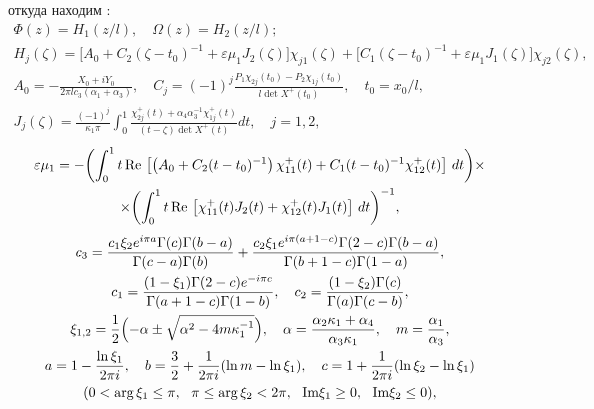 откуда находим \cite{vas-sil:bib:Hvochinskaya}:
\begin{gather*}
\Phi(z)=H_1(z/l), \quad   \Omega(z)=H_2(z/l);
\\
H_j(\zeta)=\bigl[A_0{+}C_2(\zeta{-}t_0)^{-1}{+}\varepsilon \mu_1 J_2(\zeta)\bigr]\chi_{j1}(\zeta)+  
\bigl[C_1(\zeta{-}t_0)^{-1}{+}\varepsilon\mu_1 J_1(\zeta)\bigr]\chi_{j2}(\zeta),\\
A_0=-\frac{X_0+iY_0}{2\pi lc_3(\alpha_1+\alpha_3)},\quad  C_j=(-1)^j\frac{P_1\chi_{2j}(t_0)-P_2\chi_{1j}(t_0)}{l\det X^{+}(t_0)},\quad  t_0=x_0/l,
\\
J_j(\zeta)=\frac{(-1)^j}{\kappa_1\pi}\int_0^1 \frac{\chi_{2j}^{+}(t)+\alpha_4\alpha_3^{-1}\chi_{1j}^{+}(t)}{(t-\zeta)\det X^{+}(t)} dt,\quad  j=1, 2,
\end{gather*}
\begin{multline*}
\varepsilon\mu_1=-\biggl(
\int _0^1 t\,\mbox{Re\,}\left[\left(A_0+C_2(t-t_0)^{-1}\right)\chi_{11}^{+}(t)+C_1(t-t_0)^{-1}\chi_{12}^{+}(t)\right]\,dt\biggr)\times \\
\times\biggl(\int _0^1 t\,\mbox{Re\,}\left[\chi_{11}^{+}(t)J_2(t)+\chi_{12}^{+}(t)J_1(t)\right]\,dt\biggr)^{-1},
\end{multline*}
\begin{gather*}
c_3=\frac{c_1\xi_2e^{i\pi a}\Gamma(c)\Gamma(b-a)}{\Gamma(c-a)\Gamma(b)}+\frac{c_2\xi_1e^{i\pi (a+1-c)}\Gamma(2-c)\Gamma(b-a)}{\Gamma(b+1-c)\Gamma(1-a)},\\
c_1=\frac{(1-\xi_1)\Gamma(2-c)e^{-i\pi c}}{\Gamma(a+1-c)\Gamma(1-b)},\quad  c_2=\frac{(1-\xi_2)\Gamma(c)}{\Gamma(a)\Gamma(c-b)}, \\
\xi_{1, 2}=\frac{1}{2}\Bigl(-\alpha\pm\sqrt{\alpha^2-4m\kappa_1^{-1}}\Bigr),\quad  \alpha=\frac{\alpha_2\kappa_1+\alpha_4}{\alpha_3\kappa_1},\quad   m=\frac{\alpha_1}{\alpha_3},\\
a=1-\frac{\ln\xi_1}{2\pi i},\quad  b=\frac{3}{2}+\frac{1}{2\pi i}(\ln m-\ln\xi_1),\quad   c=1+\frac{1}{2\pi i}(\ln\xi_2-\ln\xi_1)\\
(0<\arg\xi_1\le\pi,\ \ \pi\le\arg\xi_2<2\pi,\ \ \mbox{Im}\xi_1\ge0,\ \ \mbox{Im}\xi_2\le0),
\end{gather*}


